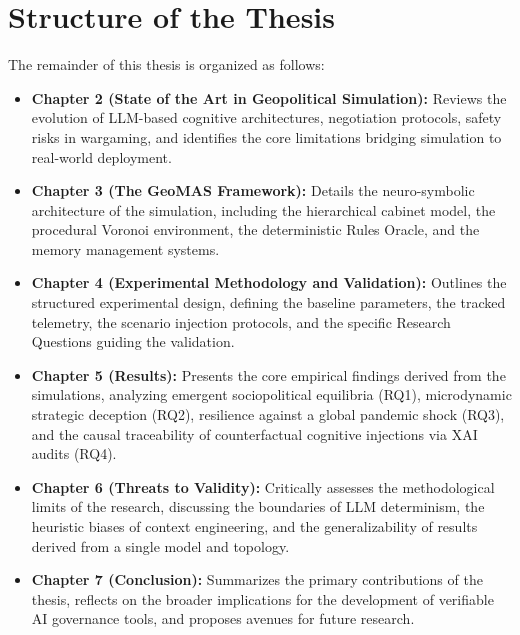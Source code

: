 \section{Structure of the Thesis}
\label{sec:intro_structure}
The remainder of this thesis is organized as follows:
\begin{itemize}
    \item \textbf{Chapter 2 (State of the Art in Geopolitical Simulation):} Reviews the evolution of LLM-based cognitive architectures, negotiation protocols, safety risks in wargaming, and identifies the core limitations bridging simulation to real-world deployment.
    \item \textbf{Chapter 3 (The GeoMAS Framework):} Details the neuro-symbolic architecture of the simulation, including the hierarchical cabinet model, the procedural Voronoi environment, the deterministic Rules Oracle, and the memory management systems.
    \item \textbf{Chapter 4 (Experimental Methodology and Validation):} Outlines the structured experimental design, defining the baseline parameters, the tracked telemetry, the scenario injection protocols, and the specific Research Questions guiding the validation.
    \item \textbf{Chapter 5 (Results):} Presents the core empirical findings derived from the simulations, analyzing emergent sociopolitical equilibria (RQ1), microdynamic strategic deception (RQ2), resilience against a global pandemic shock (RQ3), and the causal traceability of counterfactual cognitive injections via XAI audits (RQ4).
    \item \textbf{Chapter 6 (Threats to Validity):} Critically assesses the methodological limits of the research, discussing the boundaries of LLM determinism, the heuristic biases of context engineering, and the generalizability of results derived from a single model and topology.
    \item \textbf{Chapter 7 (Conclusion):} Summarizes the primary contributions of the thesis, reflects on the broader implications for the development of verifiable AI governance tools, and proposes avenues for future research.
\end{itemize}